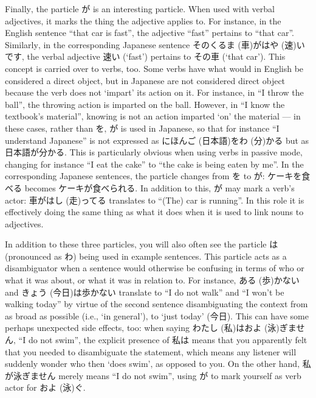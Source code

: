 \documentclass[11pt, b5paper, twoside, openright, onecolumn]{book}
\makeatletter
\newcommand*{\rubystack}[2]{{\relscale{0.5}%
  \begin{tabular}[b]{@{}c@{}}%
    {#1}\\%
   {\textscale{2}{#2}}%
  \end{tabular}}%
}
\DeclareRobustCommand*{\ruby}[2]{%
  \mbox{%
    \setlength{\parskip}{0ex}%
    \BeginAccSupp{method=pdfstringdef,ActualText={#1}}%
      \rubystack{\phantom{#2}}{#1}%
      \llap{%
        \rubystack{#2}{\phantom{#1}}%
      }%
    \EndAccSupp{}%
  }%
}
\renewcommand*{\ruby}[2]{#2 (#1)}%
\makeatother
\begin{document}
Finally‚ the particle が is an interesting particle. When used with verbal adjectives‚ it marks the thing the adjective applies to. For instance‚ in the English sentence “that car is fast”‚ the adjective “fast” pertains to “that car”. Similarly‚ in the corresponding Japanese sentence その\ruby{車}{くるま}が\ruby{速}{はや}いです‚ the verbal adjective 速い (‘fast’) pertains to その車 (‘that car’). This concept is carried over to verbs‚ too. Some verbs have what would in English be considered a direct object‚ but in Japanese are not considered direct object because the verb does not ‘impart’ its action on it. For instance‚ in “I throw the ball”‚ the throwing action is imparted on the ball. However‚ in “I know the textbook’s material”‚ knowing is not an action imparted ‘on’ the material — in these cases‚ rather than を‚ が is used in Japanese‚ so that for instance “I understand Japanese” is not expressed as \ruby{日本語}{にほんご}を\ruby{分}{わ}かる but as 日本語が分かる. This is particularly obvious when using verbs in passive mode‚ changing for instance “I eat the cake” to “the cake is being eaten by me”. In the corresponding Japanese sentences‚ the particle changes from を to が: ケーキを食べる becomes ケーキが食べられる. In addition to this‚ が may mark a verb’s actor: 車が\ruby{走}{はし}ってる translates to “(The) car is running”. In this role it is effectively doing the same thing as what it does when it is used to link nouns to adjectives.

In addition to these three particles‚ you will also often see the particle は (pronounced as わ) being used in example sentences. This particle acts as a disambiguator when a sentence would otherwise be confusing in terms of who or what it was about‚ or what it was in relation to. For instance‚ \ruby{歩}{ある}かない and \ruby{今日}{きょう}は歩かない translate to “I do not walk” and “I won’t be walking today” by virtue of the second sentence disambiguating the context from as broad as possible (i.e.‚ ‘in general’)‚ to ‘just today’ (今日). This can have some perhaps unexpected side effects‚ too: when saying \ruby{私}{わたし}は\ruby{泳}{およ}ぎません‚ “I do not swim”‚ the explicit presence of 私は means that you apparently felt that you needed to disambiguate the statement‚ which means any listener will suddenly wonder who then ‘does swim’‚ as opposed to you. On the other hand‚ 私が泳ぎません merely means “I do not swim”‚ using が to mark yourself as verb actor for \ruby{泳}{およ}ぐ.
\end{document}
